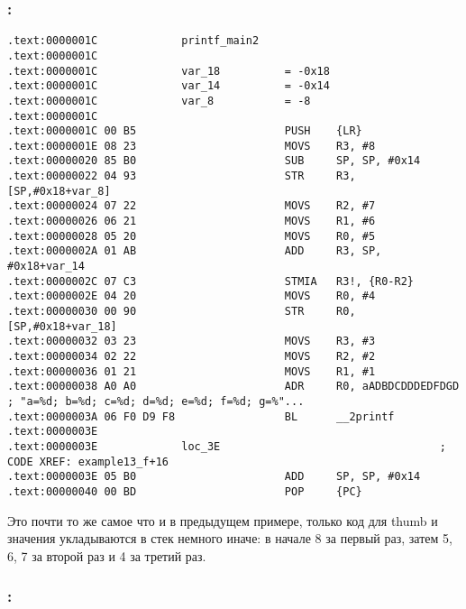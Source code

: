 \subsubsection{\OptimizingKeil: \ThumbMode}

\begin{lstlisting}
.text:0000001C             printf_main2
.text:0000001C
.text:0000001C             var_18          = -0x18
.text:0000001C             var_14          = -0x14
.text:0000001C             var_8           = -8
.text:0000001C
.text:0000001C 00 B5                       PUSH    {LR}
.text:0000001E 08 23                       MOVS    R3, #8
.text:00000020 85 B0                       SUB     SP, SP, #0x14
.text:00000022 04 93                       STR     R3, [SP,#0x18+var_8]
.text:00000024 07 22                       MOVS    R2, #7
.text:00000026 06 21                       MOVS    R1, #6
.text:00000028 05 20                       MOVS    R0, #5
.text:0000002A 01 AB                       ADD     R3, SP, #0x18+var_14
.text:0000002C 07 C3                       STMIA   R3!, {R0-R2}
.text:0000002E 04 20                       MOVS    R0, #4
.text:00000030 00 90                       STR     R0, [SP,#0x18+var_18]
.text:00000032 03 23                       MOVS    R3, #3
.text:00000034 02 22                       MOVS    R2, #2
.text:00000036 01 21                       MOVS    R1, #1
.text:00000038 A0 A0                       ADR     R0, aADBDCDDDEDFDGD ; "a=%d; b=%d; c=%d; d=%d; e=%d; f=%d; g=%"...
.text:0000003A 06 F0 D9 F8                 BL      __2printf
.text:0000003E
.text:0000003E             loc_3E                                  ; CODE XREF: example13_f+16
.text:0000003E 05 B0                       ADD     SP, SP, #0x14
.text:00000040 00 BD                       POP     {PC}
\end{lstlisting}

Это почти то же самое что и в предыдущем примере, только код для thumb и значения укладываются в 
стек немного иначе: в начале 8 за первый раз, затем 5, 6, 7 за второй раз и 4 за третий раз.

\subsubsection{\OptimizingXcode: \ARMMode}

